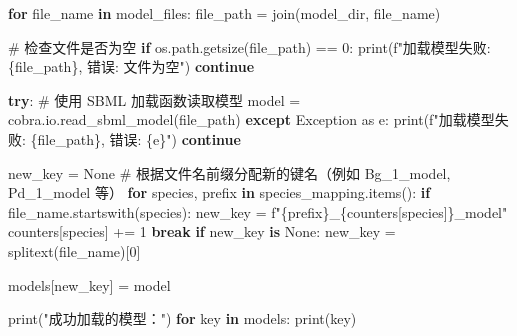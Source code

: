 \documentclass[
  letterpaper,
  DIV=11,
  numbers=noendperiod]{scrartcl}
\newenvironment{Shaded}{\begin{snugshade}}{\end{snugshade}}
\newcommand{\BuiltInTok}[1]{\textcolor[rgb]{0.00,0.23,0.31}{#1}}
\newcommand{\CommentTok}[1]{\textcolor[rgb]{0.37,0.37,0.37}{#1}}
\newcommand{\ControlFlowTok}[1]{\textcolor[rgb]{0.00,0.23,0.31}{\textbf{#1}}}
\newcommand{\DecValTok}[1]{\textcolor[rgb]{0.68,0.00,0.00}{#1}}
\newcommand{\ImportTok}[1]{\textcolor[rgb]{0.00,0.46,0.62}{#1}}
\newcommand{\KeywordTok}[1]{\textcolor[rgb]{0.00,0.23,0.31}{\textbf{#1}}}
\newcommand{\NormalTok}[1]{\textcolor[rgb]{0.00,0.23,0.31}{#1}}
\newcommand{\OperatorTok}[1]{\textcolor[rgb]{0.37,0.37,0.37}{#1}}
\newcommand{\PreprocessorTok}[1]{\textcolor[rgb]{0.68,0.00,0.00}{#1}}
\newcommand{\SpecialCharTok}[1]{\textcolor[rgb]{0.37,0.37,0.37}{#1}}
\newcommand{\SpecialStringTok}[1]{\textcolor[rgb]{0.13,0.47,0.30}{#1}}
\newcommand{\StringTok}[1]{\textcolor[rgb]{0.13,0.47,0.30}{#1}}
\newcommand{\VariableTok}[1]{\textcolor[rgb]{0.07,0.07,0.07}{#1}}
\begin{document}
\begin{Shaded}
\begin{Highlighting}[]
\ControlFlowTok{for}\NormalTok{ file\_name }\KeywordTok{in}\NormalTok{ model\_files:}
\NormalTok{    file\_path }\OperatorTok{=}\NormalTok{ join(model\_dir, file\_name)}
    
    \CommentTok{\# 检查文件是否为空}
    \ControlFlowTok{if}\NormalTok{ os.path.getsize(file\_path) }\OperatorTok{==} \DecValTok{0}\NormalTok{:}
        \BuiltInTok{print}\NormalTok{(}\SpecialStringTok{f"加载模型失败: }\SpecialCharTok{\{}\NormalTok{file\_path}\SpecialCharTok{\}}\SpecialStringTok{, 错误: 文件为空"}\NormalTok{)}
        \ControlFlowTok{continue}

    \ControlFlowTok{try}\NormalTok{:}
        \CommentTok{\# 使用 SBML 加载函数读取模型}
\NormalTok{        model }\OperatorTok{=}\NormalTok{ cobra.io.read\_sbml\_model(file\_path)}
    \ControlFlowTok{except} \PreprocessorTok{Exception} \ImportTok{as}\NormalTok{ e:}
        \BuiltInTok{print}\NormalTok{(}\SpecialStringTok{f"加载模型失败: }\SpecialCharTok{\{}\NormalTok{file\_path}\SpecialCharTok{\}}\SpecialStringTok{, 错误: }\SpecialCharTok{\{}\NormalTok{e}\SpecialCharTok{\}}\SpecialStringTok{"}\NormalTok{)}
        \ControlFlowTok{continue}

\NormalTok{    new\_key }\OperatorTok{=} \VariableTok{None}
    \CommentTok{\# 根据文件名前缀分配新的键名（例如 Bg\_1\_model, Pd\_1\_model 等）}
    \ControlFlowTok{for}\NormalTok{ species, prefix }\KeywordTok{in}\NormalTok{ species\_mapping.items():}
        \ControlFlowTok{if}\NormalTok{ file\_name.startswith(species):}
\NormalTok{            new\_key }\OperatorTok{=} \SpecialStringTok{f"}\SpecialCharTok{\{}\NormalTok{prefix}\SpecialCharTok{\}}\SpecialStringTok{\_}\SpecialCharTok{\{}\NormalTok{counters[species]}\SpecialCharTok{\}}\SpecialStringTok{\_model"}
\NormalTok{            counters[species] }\OperatorTok{+=} \DecValTok{1}
            \ControlFlowTok{break}
    \ControlFlowTok{if}\NormalTok{ new\_key }\KeywordTok{is} \VariableTok{None}\NormalTok{:}
\NormalTok{        new\_key }\OperatorTok{=}\NormalTok{ splitext(file\_name)[}\DecValTok{0}\NormalTok{]}
    
\NormalTok{    models[new\_key] }\OperatorTok{=}\NormalTok{ model}

\BuiltInTok{print}\NormalTok{(}\StringTok{"成功加载的模型："}\NormalTok{)}
\ControlFlowTok{for}\NormalTok{ key }\KeywordTok{in}\NormalTok{ models:}
    \BuiltInTok{print}\NormalTok{(key)}
\end{Highlighting}
\end{Shaded}
\end{document}
